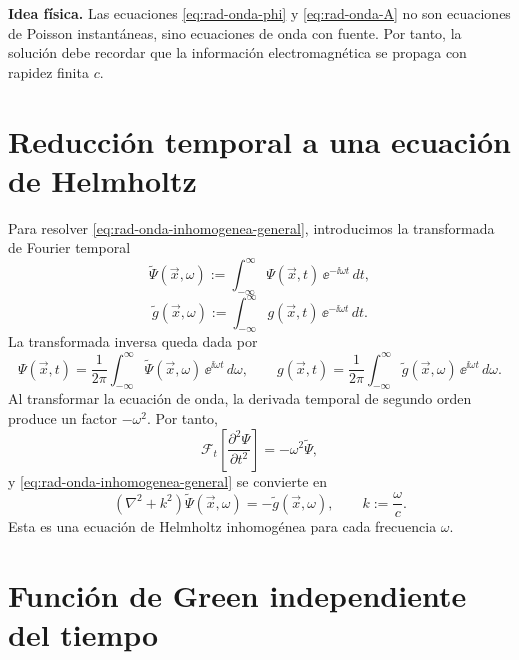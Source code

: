 \documentclass[../main.tex]{subfiles}
\begin{document}
\begin{cajaidea}
\textbf{Idea física.} Las ecuaciones \eqref{eq:rad-onda-phi} y \eqref{eq:rad-onda-A} no son ecuaciones de Poisson instantáneas, sino ecuaciones de onda con fuente. Por tanto, la solución debe recordar que la información electromagnética se propaga con rapidez finita $c$.
\end{cajaidea}

\section{Reducción temporal a una ecuación de Helmholtz}
\label{subsec:helmholtz-green-retardados}

Para resolver \eqref{eq:rad-onda-inhomogenea-general}, introducimos la transformada de Fourier temporal
\begin{equation}
    \widetilde{\Psi}(\vec x,\omega):=
    \int_{-\infty}^{\infty}\Psi(\vec x,t)\,\ee^{-\ii\omega t}\,dt,
    \label{eq:rad-fourier-psi}
\end{equation}
\begin{equation}
    \widetilde g(\vec x,\omega):=
    \int_{-\infty}^{\infty}g(\vec x,t)\,\ee^{-\ii\omega t}\,dt.
    \label{eq:rad-fourier-g}
\end{equation}
La transformada inversa queda dada por
\begin{equation}
    \Psi(\vec x,t)=\frac{1}{2\pi}\int_{-\infty}^{\infty}
    \widetilde\Psi(\vec x,\omega)\,\ee^{\ii\omega t}\,d\omega,
    \qquad
    g(\vec x,t)=\frac{1}{2\pi}\int_{-\infty}^{\infty}
    \widetilde g(\vec x,\omega)\,\ee^{\ii\omega t}\,d\omega.
    \label{eq:rad-fourier-inversa}
\end{equation}
Al transformar la ecuación de onda, la derivada temporal de segundo orden produce un factor $-\omega^2$. Por tanto,
\begin{equation*}
    \mathcal F_t\left[\frac{\partial^2\Psi}{\partial t^2}\right]
    =-\omega^2\widetilde\Psi,
\end{equation*}
y \eqref{eq:rad-onda-inhomogenea-general} se convierte en
\begin{equation}
    \left(\nabla^2+k^2\right)\widetilde\Psi(\vec x,\omega)
    =-\widetilde g(\vec x,\omega),
    \qquad
    k:=\frac{\omega}{c}.
    \label{eq:rad-helmholtz-inhomogenea}
\end{equation}
Esta es una ecuación de Helmholtz inhomogénea para cada frecuencia $\omega$.

\section{Función de Green independiente del tiempo}
\label{subsec:green-helmholtz-retardada}
\end{document}
